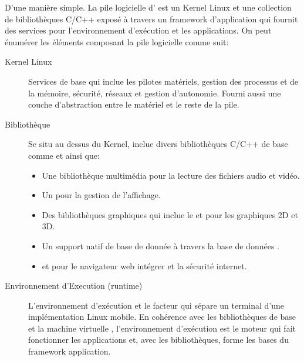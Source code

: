 D'une manière simple. La pile logicielle d'\android{} est un Kernel Linux et une collection de bibliothèques C/C++ exposé à travers un framework d'application qui fournit des services pour l'environnement d'exécution et les applications. On peut énumérer les éléments composant la pile logicielle comme suit:

\begin{description}

\item [Kernel Linux]
Services de base qui inclue les pilotes matériels, gestion des processus et de la mémoire, sécurité, réseaux et gestion d'autonomie. Fourni aussi une couche d'abstraction entre le matériel et le reste de la pile.

\item [Bibliothèque]
Se situ au dessus du Kernel, \android{} inclue divers bibliothèques C/C++ de base comme  et  ainsi que:

\begin{itemize}

\item Une bibliothèque multimédia pour la lecture des fichiers audio et vidéo.

\item Un  pour la gestion de l'affichage.

\item Des bibliothèques graphiques qui inclue le  et  pour les graphiques 2D et 3D.

\item Un support natif de base de donnée à travers la base de données .

\item {} et  pour le navigateur web intégrer et la sécurité internet.

\end{itemize}

\item [Environnement d'Execution (runtime) \android{}]

L'environnement d’exécution et le facteur qui sépare un terminal \android{}
d'une implémentation Linux mobile. En cohérence avec les bibliothèques de base
et la machine virtuelle , l'environnement d’exécution \android{} est
le moteur qui fait fonctionner les applications et, avec les bibliothèques,
forme les bases du framework application.

\begin{description}


\end{description}
\end{description}
